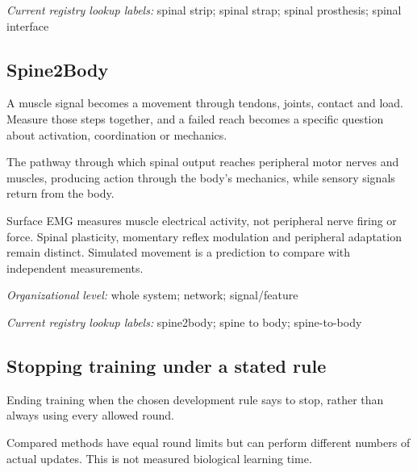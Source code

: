 \noindent\textit{Current registry lookup labels:} spinal strip; spinal strap; spinal prosthesis; spinal interface\par

\begin{samepage}
\subsection*{Spine2Body}
\noindent A muscle signal becomes a movement through tendons, joints, contact and load. Measure those steps together, and a failed reach becomes a specific question about activation, coordination or mechanics.\par
\end{samepage}
\noindent The pathway through which spinal output reaches peripheral motor nerves and muscles, producing action through the body's mechanics, while sensory signals return from the body.\par
\noindent Surface EMG measures muscle electrical activity, not peripheral nerve firing or force. Spinal plasticity, momentary reflex modulation and peripheral adaptation remain distinct. Simulated movement is a prediction to compare with independent measurements.\par
\begin{samepage}
\noindent\textit{Organizational level:} whole system; network; signal/feature\par\nopagebreak[4]

\end{samepage}


\noindent\textit{Current registry lookup labels:} spine2body; spine to body; spine-to-body\par

\begin{samepage}
\subsection*{Stopping training under a stated rule}
\noindent Ending training when the chosen development rule says to stop, rather than always using every allowed round.\par
\end{samepage}
\begin{samepage}
\noindent Compared methods have equal round limits but can perform different numbers of actual updates. This is not measured biological learning time.\par\nopagebreak[4]

\end{samepage}


